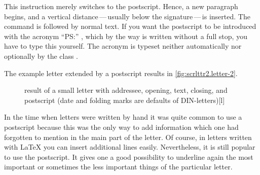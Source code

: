 \begin{Declaration}
\end{Declaration}%
This instruction merely switches to the postscript.  Hence, a new
paragraph begins, and a vertical distance\,---\,usually below the
signature\,---\,is inserted.  The command  is followed by
normal text. If you want the postscript to be introduced with the
acronym ``PS:'' , which by the way is written without a full stop, you
have to type this yourself. The acronym is typeset neither
automatically nor optionally by the class .

\begin{Example}
  The example letter extended by a postscript
  results in \autoref{fig:scrlttr2.letter-2}.
  \begin{figure}
    \setcapindent{0pt}%
    \begin{captionbeside}{%
        result of a small letter with addressee, opening, text, closing, and
        postscript
        (date and folding marks are defaults of DIN-letters)}[l]
    \end{captionbeside}
    \label{fig:scrlttr2.letter-2}
  \end{figure}
\end{Example}

\begin{Explain}
  In the time when letters were written by hand it was quite common to use a
  postscript because this was the only way to add information which one had
  forgotten to mention in the main part of the letter. Of course, in letters
  written with {\LaTeX} you can insert additional lines easily. Nevertheless,
  it is still popular to use the postscript. It gives one a good possibility
  to underline again the most important or sometimes the less important things
  of the particular letter.
\end{Explain}
%
\EndIndexGroup


